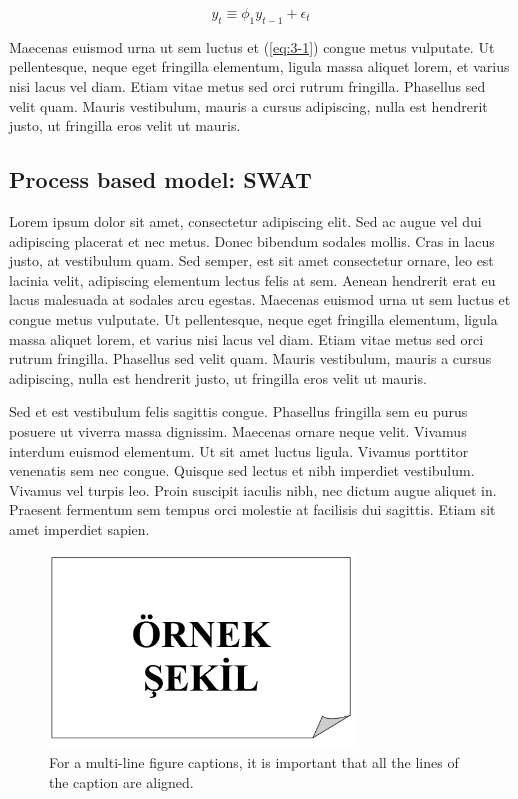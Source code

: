 \begin{equation}
\label{eq:3-1}
y_{t}  \equiv \phi_{1} y_{t-1} + \epsilon_{t}
\end{equation}

Maecenas euismod urna ut sem luctus et (\ref{eq:3-1})
congue metus vulputate. Ut pellentesque, neque eget fringilla elementum, ligula 
massa aliquet lorem, et varius nisi lacus vel diam. Etiam vitae metus sed orci 
rutrum fringilla. Phasellus sed velit quam. Mauris vestibulum, mauris a cursus 
adipiscing, nulla est hendrerit justo, ut fringilla eros velit ut mauris.

\subsection{Process based model: SWAT}

Lorem ipsum dolor sit amet, consectetur adipiscing elit. Sed ac augue vel dui 
adipiscing placerat et nec metus. Donec bibendum sodales mollis. Cras in lacus 
justo, at vestibulum quam. Sed semper, est sit amet consectetur ornare, leo est 
lacinia velit, adipiscing elementum lectus felis at sem. Aenean hendrerit erat eu 
lacus malesuada at sodales arcu egestas. Maecenas euismod urna ut sem luctus et 
congue metus vulputate. Ut pellentesque, neque eget fringilla elementum, ligula 
massa aliquet lorem, et varius nisi lacus vel diam. Etiam vitae metus sed orci 
rutrum fringilla. Phasellus sed velit quam. Mauris vestibulum, mauris a cursus 
adipiscing, nulla est hendrerit justo, ut fringilla eros velit ut mauris.

Sed et est vestibulum felis sagittis congue. Phasellus fringilla sem eu purus 
posuere ut viverra massa dignissim. Maecenas ornare neque velit. Vivamus interdum 
euismod elementum. Ut sit amet luctus ligula. Vivamus porttitor venenatis sem nec 
congue. Quisque sed lectus et nibh imperdiet vestibulum. Vivamus vel turpis leo. 
Proin suscipit iaculis nibh, nec dictum augue aliquet in. Praesent fermentum sem 
tempus orci molestie at facilisis dui sagittis. Etiam sit amet imperdiet sapien.

\begin{figure}
	\centering
	\includegraphics[width=230pt,keepaspectratio=true]{./fig/sekil3}
	\caption{For a multi-line figure captions, it is important that all the
		lines of the caption are aligned.}
	\label{fig:3-1-3}
\end{figure}

